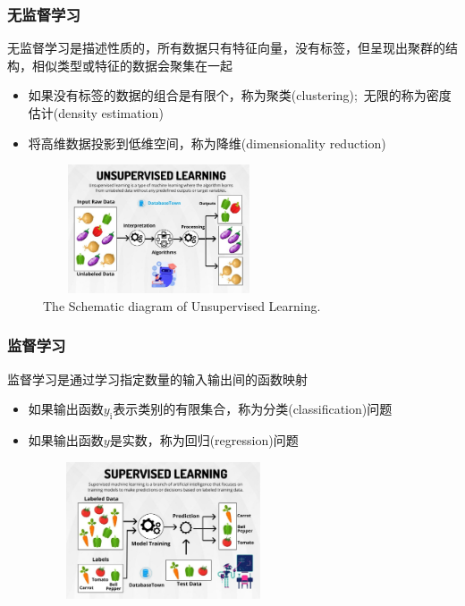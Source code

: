 \frame
{
	\frametitle{无监督学习}
无监督学习是描述性质的，所有数据只有特征向量，没有标签，但呈现出聚群的结构，相似类型或特征的数据会聚集在一起
\begin{itemize}
	\item 如果没有标签的数据的组合是有限个，称为聚类\textrm{(clustering)};~无限的称为密度估计\textrm{(density estimation)}
	\item 将高维数据投影到低维空间，称为降维\textrm{(dimensionality reduction)}
		\vskip 2pt
		{\fontsize{8.0pt}{4.2pt}\selectfont{降维有助于了解复杂数数据的检测模式}}
\end{itemize}
\begin{figure}[h!]
\centering
\vspace*{-0.1in}
\includegraphics[height=1.5in,width=2.7in,viewport=0 0 1075 720,clip]{Figures/ML_Unsupervised-Learning.jpg}
\caption{\tiny{\textrm{The Schematic diagram of Unsupervised Learning.}}}%
\label{ML_Unsupervised-Learning}
\end{figure}
}

\frame
{
	\frametitle{监督学习}
	监督学习是通过学习指定数量的输入输出间的函数映射
\begin{itemize}
	\item 如果输出函数$y_{\mathrm{i}}$表示类别的有限集合，称为分类\textrm{(classification)}问题
		\vskip 2pt
		{\fontsize{8.0pt}{4.2pt}\selectfont{模型可用来预测未知数据所属类型}}
	\item 如果输出函数$y$是实数，称为回归\textrm{(regression)}问题
		\vskip 2pt
		{\fontsize{8.0pt}{4.2pt}\selectfont{模型可用来预测未知输入数据对应的值输出值}}
\end{itemize}
\begin{figure}[h!]
\centering
\vspace*{-0.1in}
\includegraphics[height=1.6in,width=2.8in,viewport=0 0 1075 720,clip]{Figures/ML_Supervised-Learning-2.jpg}
\caption{\tiny{}}%
\label{ML_Supervised-Learning}
\end{figure}
}

